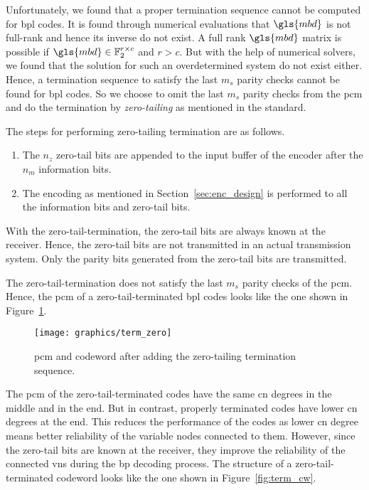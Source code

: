 Unfortunately, we found that a proper termination sequence cannot be computed for \gls{bpl} codes. It is found through numerical evaluations that $\gls{mbd}$ is not full-rank and hence its inverse do not exist. A full rank $\gls{mbd}$ matrix is possible if $\gls{mbd}\in\mathbb{F}_2^{r\times c}$ and $r>c$. But with the help of numerical solvers, we found that the solution for such an overdetermined system do not exist either. Hence, a termination sequence to satisfy the last $m_s$ parity checks cannot be found for \gls{bpl} codes. So we choose to omit the last $m_s$ parity checks from the \gls{pcm} and do the termination by \emph{zero-tailing} as mentioned in the standard.

The steps for performing zero-tailing termination are as follows.
\begin{enumerate}
  \item The $n_z$ zero-tail bits are appended to the input buffer of the encoder after the $n_m$ information bits.
  \item The encoding as mentioned in Section~\ref{sec:enc_design} is performed to all the information bits and zero-tail bits.
\end{enumerate}
With the zero-tail-termination, the zero-tail bits are always known at the receiver. Hence, the zero-tail bits are not transmitted in an actual transmission system. Only the parity bits generated from the zero-tail bits are transmitted.

The zero-tail-termination does not satisfy the last $m_s$ parity checks of the \gls{pcm}. Hence, the \gls{pcm} of a zero-tail-terminated \gls{bpl} codes looks like the one shown in Figure~\ref{fig:pcm_zero}.
\begin{figure}[htbp]
  \centering
  \texttt{[image: graphics/term\_zero]}
  \caption{\gls{pcm} and codeword after adding the zero-tailing termination sequence.}
  \label{fig:pcm_zero}
\end{figure}

The \gls{pcm} of the zero-tail-terminated codes have the same \gls{cn} degrees in the middle and in the end. But in contrast, properly terminated codes have lower \gls{cn} degrees at the end. This reduces the performance of the codes as lower \gls{cn} degree means better reliability of the variable nodes connected to them. However, since the zero-tail bits are known at the receiver, they improve the reliability of the connected \glspl{vn} during the \gls{bp} decoding process. The structure of a zero-tail-terminated codeword looks like the one shown in Figure~\ref{fig:term_cw}.

